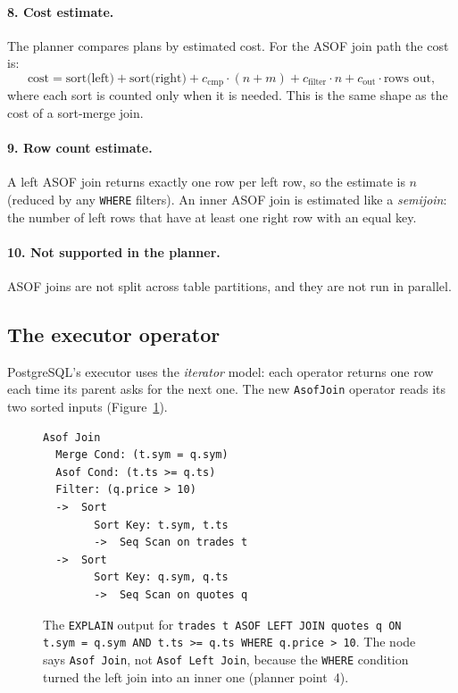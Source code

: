 \documentclass[11pt,a4paper]{article}
\newcommand{\code}[1]{\texttt{#1}}
\begin{document}
\paragraph{8. Cost estimate.}
The planner compares plans by estimated cost. For the ASOF join path the cost is:
\[
  \text{cost} = \text{sort(left)} + \text{sort(right)}
   + c_{\text{cmp}} \cdot (n + m) + c_{\text{filter}} \cdot n
   + c_{\text{out}} \cdot \text{rows out},
\]
where each sort is counted only when it is needed. This is the same shape as the cost
of a sort-merge join.

\paragraph{9. Row count estimate.}
A left ASOF join returns exactly one row per left row, so the estimate is $n$ (reduced by
any \code{WHERE} filters). An inner ASOF join is estimated like a \emph{semijoin}: the
number of left rows that have at least one right row with an equal key.

\paragraph{10. Not supported in the planner.}
ASOF joins are not split across table partitions, and they are not run in parallel.

\subsection{The executor operator}
\label{sec:executor}

PostgreSQL's executor uses the \emph{iterator} model: each operator returns one row each
time its parent asks for the next one. The new \code{AsofJoin} operator reads its two
sorted inputs (Figure~\ref{fig:plan}).

\begin{figure}[h]
\centering
\begin{lstlisting}[style=plain]
Asof Join
  Merge Cond: (t.sym = q.sym)
  Asof Cond: (t.ts >= q.ts)
  Filter: (q.price > 10)
  ->  Sort
        Sort Key: t.sym, t.ts
        ->  Seq Scan on trades t
  ->  Sort
        Sort Key: q.sym, q.ts
        ->  Seq Scan on quotes q
\end{lstlisting}
\caption{The \code{EXPLAIN} output for \code{trades t ASOF LEFT JOIN quotes q ON t.sym =
q.sym AND t.ts >= q.ts WHERE q.price > 10}. The node says \code{Asof Join}, not
\code{Asof Left Join}, because the \code{WHERE} condition turned the left join into an
inner one (planner point~4).}
\label{fig:plan}
\end{figure}
\end{document}
